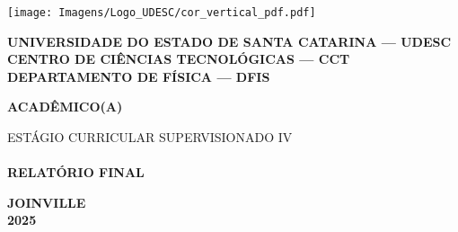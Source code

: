 \thispagestyle{empty}
\noindent
\begin{minipage}[t]{0.15\textwidth} %
  \vspace{0pt} %
  \texttt{[image: Imagens/Logo\_UDESC/cor\_vertical\_pdf.pdf]}
\end{minipage}
\hspace{0.02\textwidth} 
\begin{minipage}[t]{0.90\textwidth}
  \vspace{0.3\baselineskip} %
  \textbf{UNIVERSIDADE DO ESTADO DE SANTA CATARINA — UDESC} \\
  \textbf{CENTRO DE CIÊNCIAS TECNOLÓGICAS — CCT} \\
  \textbf{DEPARTAMENTO DE FÍSICA — DFIS}
\end{minipage}
\vspace{4cm}

\begin{center}
    \textbf{\large{ACADÊMICO(A)}}
\end{center}

\vspace{2cm}



\begin{flushright}
\colorbox{myorange}{
    \begin{minipage}[t]{9.20cm} 
        \color{white} 
        \vspace{6pt} 
        \hspace*{10pt}\parbox{\linewidth}{
        ESTÁGIO CURRICULAR SUPERVISIONADO IV\\
        \\
        \fontsize{16}{12}\selectfont \textbf{RELATÓRIO FINAL}
        }
        \vspace{6pt} 
    \end{minipage}
}
\end{flushright}
\vfill

\begin{center}
\textbf{JOINVILLE\\
        2025}
\end{center}
\pagebreak